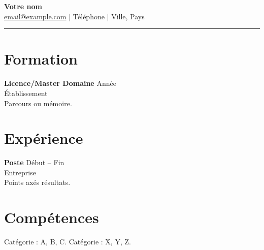 \documentclass[11pt,a4paper]{article}
\begin{document}
\begin{center}
{\LARGE \textbf{Votre nom}}\\[0.3em]
\href{mailto:email@example.com}{email@example.com} \quad | \quad Téléphone \quad | \quad Ville, Pays
\end{center}
\begin{flushright}\rule{2cm}{2.5cm}\end{flushright}
\vspace{0.6em}
\section*{Formation}
\textbf{Licence/Master Domaine} \hfill Année \\
Établissement \\
Parcours ou mémoire.

\section*{Expérience}
\textbf{Poste} \hfill Début -- Fin \\
Entreprise \\
Points axés résultats.

\section*{Compétences}
Catégorie : A, B, C. \quad Catégorie : X, Y, Z.
\end{document}
